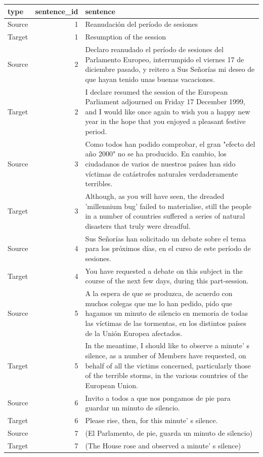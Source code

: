 \documentclass[
  letterpaper,
]{latex/krantz}
\begin{document}
\begin{table}
\centering
\begin{tabular}{lrl}
\toprule
type & sentence\_id & sentence\\
\midrule
Source & 1 & Reanudación del período de sesiones\\
Target & 1 & Resumption of the session\\
Source & 2 & Declaro reanudado el período de sesiones del Parlamento Europeo, interrumpido el viernes 17 de diciembre pasado, y reitero a Sus Señorías mi deseo de que hayan tenido unas buenas vacaciones.\\
Target & 2 & I declare resumed the session of the European Parliament adjourned on Friday 17 December 1999, and I would like once again to wish you a happy new year in the hope that you enjoyed a pleasant festive period.\\
Source & 3 & Como todos han podido comprobar, el gran "efecto del año 2000" no se ha producido. En cambio, los ciudadanos de varios de nuestros países han sido víctimas de catástrofes naturales verdaderamente terribles.\\
\addlinespace
Target & 3 & Although, as you will have seen, the dreaded 'millennium bug' failed to materialise, still the people in a number of countries suffered a series of natural disasters that truly were dreadful.\\
Source & 4 & Sus Señorías han solicitado un debate sobre el tema para los próximos días, en el curso de este período de sesiones.\\
Target & 4 & You have requested a debate on this subject in the course of the next few days, during this part-session.\\
Source & 5 & A la espera de que se produzca, de acuerdo con muchos colegas que me lo han pedido, pido que hagamos un minuto de silencio en memoria de todas las víctimas de las tormentas, en los distintos países de la Unión Europea afectados.\\
Target & 5 & In the meantime, I should like to observe a minute' s silence, as a number of Members have requested, on behalf of all the victims concerned, particularly those of the terrible storms, in the various countries of the European Union.\\
\addlinespace
Source & 6 & Invito a todos a que nos pongamos de pie para guardar un minuto de silencio.\\
Target & 6 & Please rise, then, for this minute' s silence.\\
Source & 7 & (El Parlamento, de pie, guarda un minuto de silencio)\\
Target & 7 & (The House rose and observed a minute' s silence)\\
\bottomrule
\end{tabular}
\end{table}
\end{document}
